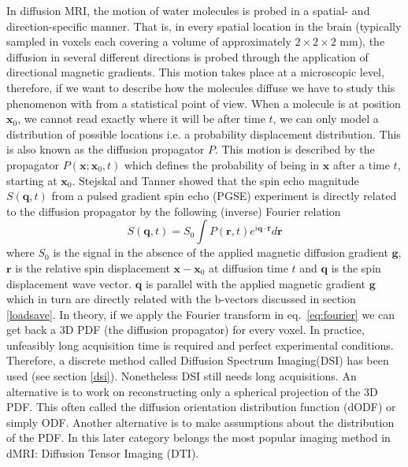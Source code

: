 \documentclass{bioinfo}
\begin{document}
In diffusion MRI, the motion of water molecules is probed in a spatial- and direction-specific manner. That is, in every spatial location in the brain (typically sampled in voxels each covering a volume of approximately $2\times2\times2$ mm), the diffusion in several different directions is probed through the application of directional magnetic gradients. This motion takes place at a microscopic level, therefore, if we want to describe how the molecules diffuse we have to study this phenomenon with from a statistical point of view. When a molecule is at position $\mathbf{x}_{0}$, we cannot read exactly where it will be after time $t$, we can only model a distribution of possible locations i.e. a probability displacement distribution. This is also known as the diffusion propagator $P$. This motion is described by the propagator $P(\mathbf{x};\mathbf{x}_{0},t)$ which defines the probability of being in $\mathbf{x}$ after a time $t$, starting at $\mathbf{x}_{0}$.
Stejskal and Tanner \citep{stejskal-tanner:65} showed that the spin echo magnitude $S(\mathbf{q},t)$ from a pulsed gradient spin echo (PGSE) experiment is directly related to the diffusion propagator by the following (inverse) Fourier relation
\begin{equation}
S(\mathbf{q},t)=S_{0}\int P(\mathbf{r},t)e^{i\mathbf{q}\cdot\mathbf{r}}d\mathbf{r}\label{eq:fourier}
\end{equation}
\noindent where $S_{0}$ is the signal in the absence of the applied magnetic diffusion gradient $\mathbf{g}$, $\mathbf{r}$ is the relative spin displacement $\mathbf{x}-\mathbf{x}_{0}$ at diffusion time $t$ and $\mathbf{q}$ is the spin displacement wave vector. $\mathbf{q}$ is parallel with the applied magnetic gradient $\mathbf{g}$ which in turn are directly related with the b-vectors discussed in section \ref{loadsave}.
In theory, if we apply the Fourier transform in eq.~\ref{eq:fourier} we can get back a 3D PDF (the diffusion propagator) for every voxel. In practice, unfeasibly long acquisition time is required and perfect experimental conditions. Therefore, a discrete method called Diffusion Spectrum Imaging(DSI) has been used (see section \ref{dsi}).
Nonetheless DSI still needs long acquisitions. An alternative is to work on reconstructing only a spherical projection of the 3D PDF. This often called the diffusion orientation distribution function (dODF) or simply ODF. Another alternative is to make assumptions about the distribution of the PDF. In this later category belongs the most popular imaging method in dMRI: Diffusion Tensor Imaging (DTI).
\end{document}
